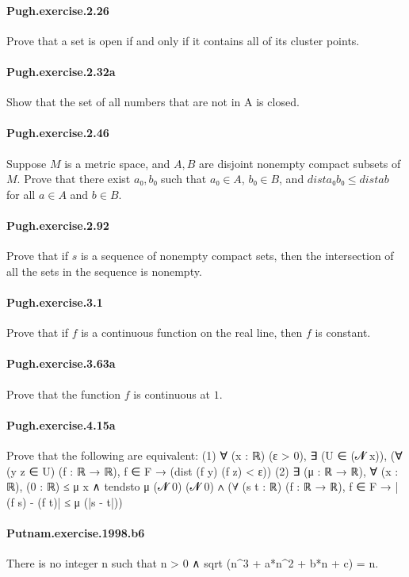 \documentclass{article}
\begin{document}
{\paragraph{Pugh.exercise.2.26} Prove that a set is open if and only if it contains all of its cluster points.

\paragraph{Pugh.exercise.2.32a} Show that the set of all numbers that are not in A is closed.

\paragraph{Pugh.exercise.2.46} Suppose $M$ is a metric space, and $A, B$ are disjoint nonempty compact subsets of $M$. Prove that there exist $a₀, b₀$ such that $a₀ ∈ A$, $b₀ ∈ B$, and $dist a₀ b₀ ≤ dist a b$ for all $a ∈ A$ and $b ∈ B$.

\paragraph{Pugh.exercise.2.92} Prove that if $s$ is a sequence of nonempty compact sets, then the intersection of all the sets in the sequence is nonempty.

\paragraph{Pugh.exercise.3.1} Prove that if $f$ is a continuous function on the real line, then $f$ is constant.

\paragraph{Pugh.exercise.3.63a} Prove that the function $f$ is continuous at $1$.

\paragraph{Pugh.exercise.4.15a} Prove that the following are equivalent:
  (1) ∀ (x : ℝ) (ε > 0), ∃ (U ∈ (𝓝 x)),
  (∀ (y z ∈ U) (f : ℝ → ℝ), f ∈ F → (dist (f y) (f z) < ε))
  (2) ∃ (μ : ℝ → ℝ), ∀ (x : ℝ), (0 : ℝ) ≤ μ x ∧ tendsto μ (𝓝 0) (𝓝 0) ∧
  (∀ (s t : ℝ) (f : ℝ → ℝ), f ∈ F → |(f s) - (f t)| ≤ μ (|s - t|))

\paragraph{Putnam.exercise.1998.b6} There is no integer n such that n > 0 ∧ sqrt (n^3 + a*n^2 + b*n + c) = n.

}
\end{document}
